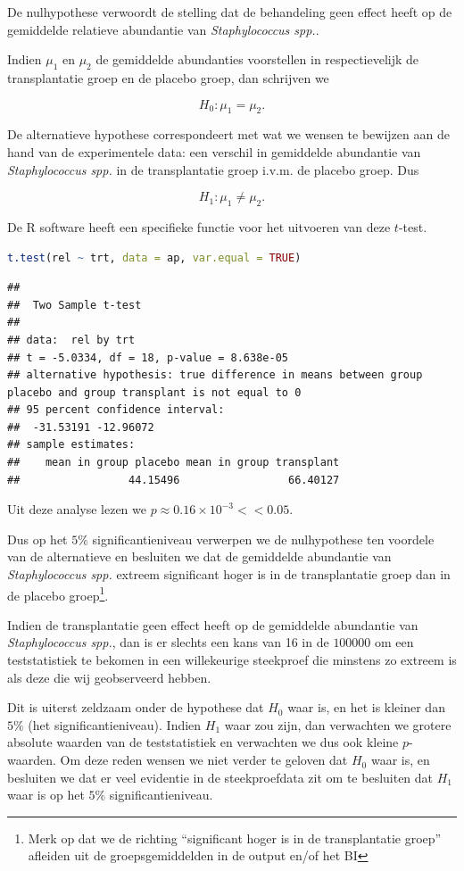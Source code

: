 \documentclass[
  12pt,dutch,coursenotes]{book}
\theoremstyle{definition}
\theoremstyle{definition}
\theoremstyle{definition}
\theoremstyle{definition}
\theoremstyle{remark}
\begin{document}
De nulhypothese verwoordt de stelling dat de behandeling geen effect heeft op de gemiddelde relatieve abundantie van \emph{Staphylococcus spp.}.

Indien \(\mu_1\) en \(\mu_2\) de gemiddelde abundanties voorstellen in respectievelijk de transplantatie groep en de placebo groep, dan schrijven we

\[H_0: \mu_1=\mu_2.\]

De alternatieve hypothese correspondeert met wat we wensen te bewijzen aan de hand van de experimentele data: een verschil in gemiddelde abundantie van \emph{Staphylococcus spp.} in de transplantatie groep i.v.m. de placebo groep. Dus

\[H_1: \mu_1\neq \mu_2.\]

De R software heeft een specifieke functie voor het uitvoeren van deze \(t\)-test.

\begin{lstlisting}[language=R]
t.test(rel ~ trt, data = ap, var.equal = TRUE)
\end{lstlisting}

\begin{lstlisting}
## 
##  Two Sample t-test
## 
## data:  rel by trt
## t = -5.0334, df = 18, p-value = 8.638e-05
## alternative hypothesis: true difference in means between group placebo and group transplant is not equal to 0
## 95 percent confidence interval:
##  -31.53191 -12.96072
## sample estimates:
##    mean in group placebo mean in group transplant 
##                 44.15496                 66.40127
\end{lstlisting}

Uit deze analyse lezen we \(p\approx 0.16 \times 10^{-3}<<0.05\).

Dus op het \(5\%\) significantieniveau verwerpen we de nulhypothese ten voordele van de alternatieve en besluiten we dat de gemiddelde abundantie van \emph{Staphylococcus spp.} extreem significant hoger is in de transplantatie groep dan in de placebo groep\footnote{Merk op dat we de richting ``significant hoger is in de transplantatie groep'' afleiden uit de groepsgemiddelden in de output en/of het BI}.

Indien de transplantatie geen effect heeft op de gemiddelde abundantie van \emph{Staphylococcus spp.}, dan is er slechts een kans van 16 in de \(100000\) om een teststatistiek te bekomen in een willekeurige steekproef die minstens zo extreem is als deze die wij geobserveerd hebben.

Dit is uiterst zeldzaam onder de hypothese dat \(H_0\) waar is, en het is kleiner dan \(5\%\) (het significantieniveau). Indien \(H_1\) waar zou zijn, dan verwachten we grotere absolute waarden van de teststatistiek en verwachten we dus ook kleine \(p\)-waarden. Om deze reden wensen we niet verder te geloven dat \(H_0\) waar is, en besluiten we dat er veel evidentie in de steekproefdata zit om te besluiten dat \(H_1\) waar is op het \(5\%\) significantieniveau.
\end{document}
